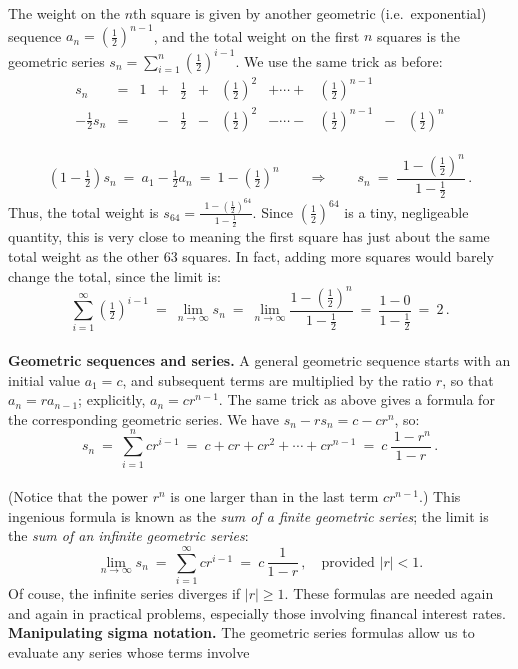 \documentclass[11pt]{article}
\begin{document}
The weight on the $n$th square is given by another geometric
(i.e.~exponential) sequence $a_n=\left(\frac12\right)^{\!n-1}$, and the total weight on the first $n$ squares is the geometric series
$s_n=\sum_{i=1}^n \left(\frac12\right)^{\!i-1}$.
We use the same trick as before:
$$\begin{array}{rcccccccccc}
s_n &=&1& + &\frac12&+& \left(\frac12\right)^{\!2}&+\cdots + &\left(\frac12\right)^{\!n-1}\\[.5em]
-\frac12s_n&=& & - &\frac12 & - &\left(\frac12\right)^{\!2} &-\cdots- &\left(\frac12\right)^{\!n-1}&-& \left(\frac12\right)^{\!n}
\end{array}$$
\\[-.8em]
$$
(1-\tfrac12)s_n  \ =\ a_1 -\tfrac12 a_n\ =\ 1-\left(\tfrac12\right)^{\!n}
\qquad\Longrightarrow\qquad
s_n \ =\ \frac{\ \ 1-\left(\frac12\right)^{\!n}}{1-\frac12} \,.
$$
Thus, the total weight is $s_{64} = \frac{\ \ 1-\left(\frac12\right)^{\!64}}{1-\frac12}$. Since
$\left(\frac12\right)^{\!64}$ is a tiny, negligeable quantity,
this is very close to  meaning the 
first square has just about the same total
weight as the other 63 squares.
In fact, adding more squares would barely change 
the total, since the limit is:
$$
\sum_{i=1}^\infty \left(\tfrac12\right)^{\!i-1} 
\ =\ 
\lim_{n\to\infty} s_n
\ =\
\lim_{n\to\infty} \frac{1-\left(\frac12\right)^{\!n}}{1-\frac12}
\ = \ \frac{1-0}{1-\frac12}\ =\ 2\,.
$$
\\[1em]
{\bf Geometric sequences and series.} 
A general geometric sequence starts with an initial value $a_1=c$, and subsequent terms are multiplied by the ratio $r$,
so that $a_n = ra_{n-1}$; explicitly, $a_n = cr^{n-1}$.
The same trick as above gives a formula for the corresponding
geometric series. We have $s_n-rs_n = c-cr^n$, so:
$$
\boxed{
\ \ 
s_n \ =\
\sum_{i=1}^n cr^{i-1}
\ =\ 
c + cr + cr^2 +\cdots +cr^{n-1}
\ =\ 
c\,\frac{\ 1-r^n}{1-r}\,. \ \
}$$
\\[-.2em]
(Notice that the power $r^n$ is one larger than in the last term $cr^{n-1}$.)
This ingenious formula is known as the {\it sum of a finite geometric series};
the limit is the {\it sum of an infinite geometric series}:
$$
\boxed{\ \ 
\lim_{n\to\infty} s_n
\ =\
\sum_{i=1}^\infty c r^{i-1} 
\ = \ c\,\frac{1}{1-r}\,, \quad\text{provided $|r|<1$.}
\ \ }
$$
Of couse, the infinite series diverges if $|r|\geq 1$.
These formulas are needed again and again in practical problems, especially
those involving financal interest rates.
\\[1em]
{\bf Manipulating sigma notation.} The geometric series formulas allow us to evaluate any series whose terms involve
\end{document}
